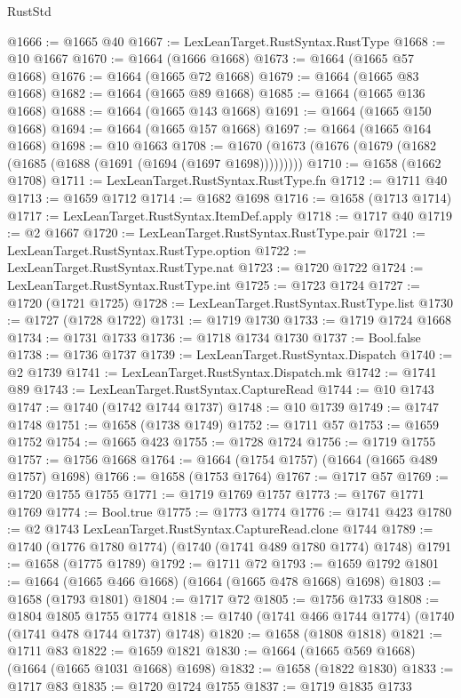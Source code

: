 \begin{lexlean}{RustStd}
\begin{coremodule}
@1666 := @1665 @40
@1667 := LexLeanTarget.RustSyntax.RustType
@1668 := @10 @1667
@1670 := @1664 (@1666 @1668)
@1673 := @1664 (@1665 @57 @1668)
@1676 := @1664 (@1665 @72 @1668)
@1679 := @1664 (@1665 @83 @1668)
@1682 := @1664 (@1665 @89 @1668)
@1685 := @1664 (@1665 @136 @1668)
@1688 := @1664 (@1665 @143 @1668)
@1691 := @1664 (@1665 @150 @1668)
@1694 := @1664 (@1665 @157 @1668)
@1697 := @1664 (@1665 @164 @1668)
@1698 := @10 @1663
@1708 := @1670 (@1673 (@1676 (@1679 (@1682 (@1685 (@1688 (@1691 (@1694 (@1697 @1698)))))))))
@1710 := @1658 (@1662 @1708)
@1711 := LexLeanTarget.RustSyntax.RustType.fn
@1712 := @1711 @40
@1713 := @1659 @1712
@1714 := @1682 @1698
@1716 := @1658 (@1713 @1714)
@1717 := LexLeanTarget.RustSyntax.ItemDef.apply
@1718 := @1717 @40
@1719 := @2 @1667
@1720 := LexLeanTarget.RustSyntax.RustType.pair
@1721 := LexLeanTarget.RustSyntax.RustType.option
@1722 := LexLeanTarget.RustSyntax.RustType.nat
@1723 := @1720 @1722
@1724 := LexLeanTarget.RustSyntax.RustType.int
@1725 := @1723 @1724
@1727 := @1720 (@1721 @1725)
@1728 := LexLeanTarget.RustSyntax.RustType.list
@1730 := @1727 (@1728 @1722)
@1731 := @1719 @1730
@1733 := @1719 @1724 @1668
@1734 := @1731 @1733
@1736 := @1718 @1734 @1730
@1737 := Bool.false
@1738 := @1736 @1737
@1739 := LexLeanTarget.RustSyntax.Dispatch
@1740 := @2 @1739
@1741 := LexLeanTarget.RustSyntax.Dispatch.mk
@1742 := @1741 @89
@1743 := LexLeanTarget.RustSyntax.CaptureRead
@1744 := @10 @1743
@1747 := @1740 (@1742 @1744 @1737)
@1748 := @10 @1739
@1749 := @1747 @1748
@1751 := @1658 (@1738 @1749)
@1752 := @1711 @57
@1753 := @1659 @1752
@1754 := @1665 @423
@1755 := @1728 @1724
@1756 := @1719 @1755
@1757 := @1756 @1668
@1764 := @1664 (@1754 @1757) (@1664 (@1665 @489 @1757) @1698)
@1766 := @1658 (@1753 @1764)
@1767 := @1717 @57
@1769 := @1720 @1755 @1755
@1771 := @1719 @1769 @1757
@1773 := @1767 @1771 @1769
@1774 := Bool.true
@1775 := @1773 @1774
@1776 := @1741 @423
@1780 := @2 @1743 LexLeanTarget.RustSyntax.CaptureRead.clone @1744
@1789 := @1740 (@1776 @1780 @1774) (@1740 (@1741 @489 @1780 @1774) @1748)
@1791 := @1658 (@1775 @1789)
@1792 := @1711 @72
@1793 := @1659 @1792
@1801 := @1664 (@1665 @466 @1668) (@1664 (@1665 @478 @1668) @1698)
@1803 := @1658 (@1793 @1801)
@1804 := @1717 @72
@1805 := @1756 @1733
@1808 := @1804 @1805 @1755 @1774
@1818 := @1740 (@1741 @466 @1744 @1774) (@1740 (@1741 @478 @1744 @1737) @1748)
@1820 := @1658 (@1808 @1818)
@1821 := @1711 @83
@1822 := @1659 @1821
@1830 := @1664 (@1665 @569 @1668) (@1664 (@1665 @1031 @1668) @1698)
@1832 := @1658 (@1822 @1830)
@1833 := @1717 @83
@1835 := @1720 @1724 @1755
@1837 := @1719 @1835 @1733

\end{coremodule}
\end{lexlean}
